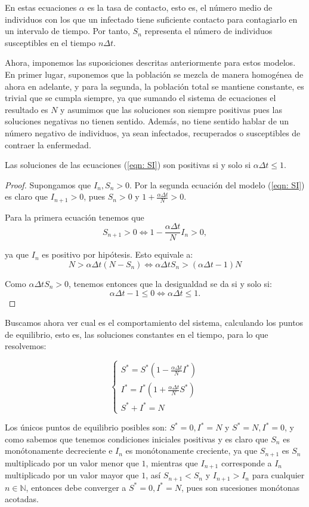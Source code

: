 En estas ecuaciones $\alpha$ es la tasa de contacto, esto es, el número medio de individuos con los que un infectado tiene suficiente contacto para contagiarlo en un intervalo de tiempo. Por tanto, $S_n$ representa el número de individuos susceptibles en el tiempo $n\Delta t$.

Ahora, imponemos las suposiciones descritas anteriormente para estos modelos. En primer lugar, suponemos que la población se mezcla de manera homogénea de ahora en adelante, y para la segunda, la población total se mantiene constante,  es trivial que se cumpla siempre, ya que sumando el sistema de ecuaciones el resultado es $N$ y asumimos que las soluciones son siempre positivas pues las soluciones negativas no tienen sentido.
Además, no tiene sentido hablar de un número negativo de individuos, ya sean infectados, recuperados o susceptibles de contraer la enfermedad.

\begin{proposition}
Las soluciones de las ecuaciones (\ref{eqn: SI}) son positivas si y solo si $\alpha\Delta t \leq 1$.
\end{proposition}

\begin{proof}
Supongamos que $I_n, S_n > 0$. Por la segunda ecuación del modelo (\ref{eqn: SI}) es claro que $I_{n+1}>0$, pues $S_n>0$ y $1+\frac{\alpha\Delta t}{N}>0$.

Para la primera ecuación tenemos que 
$$S_{n+1}>0 \Leftrightarrow 1-\frac{\alpha\Delta t}{N}I_n >0,$$

ya que $I_n$ es positivo por hipótesis. Esto equivale a:
$$N>\alpha\Delta t(N-S_n) \Leftrightarrow \alpha\Delta t S_n > (\alpha\Delta t -1) N$$

Como $\alpha\Delta t S_n > 0$, tenemos entonces que la desigualdad se da si y solo si:
$$\alpha\Delta t -1 \leq 0 \Leftrightarrow \alpha\Delta t \leq 1.$$
\end{proof}


Buscamos ahora ver cual es el comportamiento del sistema, calculando los puntos de equilibrio, esto es, las soluciones constantes en el tiempo, para lo que resolvemos:

$$
\begin{cases}
S^*=S^*\left( 1-\frac{\alpha\Delta t}{N}I^*\right) \\
I^*=I^*\left( 1+\frac{\alpha\Delta t}{N}S^*\right) \\
S^*+I^*=N
\end{cases}
$$

Los únicos puntos de equilibrio posibles son: $S^*=0, I^*=N$ y $S^*=N, I^*=0$, y como sabemos que tenemos condiciones iniciales positivas y es claro que $S_n$ es monótonamente decreciente e $I_n$ es monótonamente creciente, ya que $S_{n+1}$ es $S_n$ multiplicado por un valor menor que $1$, mientras que $I_{n+1}$ corresponde a $I_n$ multiplicado por un valor mayor que $1$, así $S_{n+1}<S_n$ y $I_{n+1}>I_n$ para cualquier $n\in\mathbb{N}$, entonces debe converger a $S^*=0, I^*=N$, pues son sucesiones monótonas acotadas.

